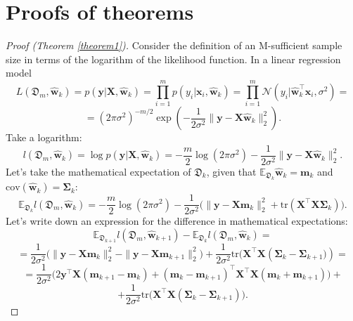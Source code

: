 \documentclass[
11pt,%
tightenlines,%
twoside,%
onecolumn,%
nofloats,%
nobibnotes,%
nofootinbib,%
superscriptaddress,%
noshowpacs,%
centertags]%
{revtex4-2}
\begin{document}
\appendix

\section{Proofs of theorems}\label{append}

\begin{proof}[Proof (Theorem \ref{theorem1})]
Consider the definition of an M-sufficient sample size in terms of the logarithm of the likelihood function. In a linear regression model
    \[ L\left( \mathfrak{D}_m, \hat{\mathbf{w}}_k \right) = p(\mathbf{y} | \mathbf{X}, \hat{\mathbf{w}}_k) = \prod_{i=1}^{m} p(y_i | \mathbf{x}_i, \hat{\mathbf{w}}_k) = \prod_{i=1}^{m} \mathcal{N}\left( y_i | \hat{\mathbf{w}}_k^{\top} \mathbf{x}_i, \sigma^2 \right) = \]
    \[= \left(2\pi\sigma^2 \right)^{-m/2} \exp\left(-\dfrac{1}{2\sigma^2}\|\mathbf{y} -\mathbf{X} \hat{\mathbf{w}}_k\|_2^2 \right). \]
Take a logarithm:
    \[ l\left( \mathfrak{D}_m, \hat{\mathbf{w}}_k \right) = \log p(\mathbf{y} | \mathbf{X}, \hat{\mathbf{w}}_k) = -\dfrac{m}{2}\log\left( 2\pi\sigma^2 \right) - \dfrac{1}{2\sigma^2} \| \mathbf{y} - \mathbf{X} \hat{\mathbf{w}}_k \|_2^2. \]
Let's take the mathematical expectation of $\mathfrak{D}_k$, given that $\mathbb{E}_{\mathfrak{D}_k}\hat{\mathbf{w}}_k=\mathbf{m}_k$ and $\text{cov}(\hat{\mathbf{w}}_k) = \mathbf{\Sigma}_k$:
    \[ \mathbb{E}_{\mathfrak{D}_k} l\left( \mathfrak{D}_m, \hat{\mathbf{w}}_k \right) = -\dfrac{m}{2}\log\left( 2\pi\sigma^2 \right) - \dfrac{1}{2\sigma^2} \Big( \| \mathbf{y} - \mathbf{X} \mathbf{m}_k \|_2^2 + \text{tr}\left( \mathbf{X}^{\top}\mathbf{X} \mathbf{\Sigma}_k \right) \Big). \]
    Let's write down an expression for the difference in mathematical expectations:
    \[ \mathbb{E}_{\mathfrak{D}_{k+1}} l(\mathfrak{D}_m, \hat{\mathbf{w}}_{k+1}) - \mathbb{E}_{\mathfrak{D}_k} l(\mathfrak{D}_m, \hat{\mathbf{w}}_{k}) = \]
    \[ = \dfrac{1}{2\sigma^2} \Big( \| \mathbf{y} - \mathbf{X} \mathbf{m}_k \|_2^2 - \| \mathbf{y} - \mathbf{X} \mathbf{m}_{k+1} \|_2^2 \Big) + \dfrac{1}{2\sigma^2} \text{tr} \Big( \mathbf{X}^{\top}\mathbf{X} \left( \mathbf{\Sigma}_k - \mathbf{\Sigma}_{k+1} \Big) \right) = \]
    \[ = \dfrac{1}{2\sigma^2} \Big( 2 \mathbf{y}^{\top} \mathbf{X} (\mathbf{m}_{k+1} - \mathbf{m}_k) + (\mathbf{m}_k - \mathbf{m}_{k+1})^{\top} \mathbf{X}^{\top}\mathbf{X} (\mathbf{m}_k + \mathbf{m}_{k+1}) \Big) + \]
    \[ + \dfrac{1}{2\sigma^2} \text{tr} \Big( \mathbf{X}^{\top}\mathbf{X} \left( \mathbf{\Sigma}_k - \mathbf{\Sigma}_{k+1} \right) \Big). \]

\end{proof}
\end{document}
